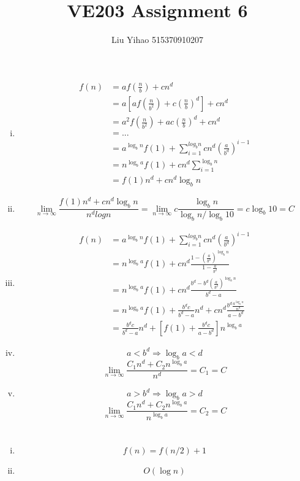 \documentclass{article}
\title{VE203 Assignment 6}
\author{Liu Yihao 515370910207}
\date{}
\begin{document}
\maketitle

\section{}
\begin{enumerate}[i)]
\item
\begin{align*}
f(n)&=af\left(\frac{n}{b}\right)+cn^d\\
&=a\left[af\left(\frac{n}{b^2}\right)+c\left(\frac{n}{b}\right)^d\right]+cn^d\\
&=a^2f\left(\frac{n}{b^2}\right)+ac\left(\frac{n}{b}\right)^d+cn^d\\
&=...\\
&=a^{\log_bn}f(1)+\sum_{i=1}^{log_bn}cn^d\left(\frac{a}{b^d}\right)^{i-1}\\
&=n^{\log_ba}f(1)+cn^d\sum_{i=1}^{\log_bn}\\
&=f(1)n^d+cn^d\log_bn
\end{align*}
\item
$$\lim_{n\to\infty}\frac{f(1)n^d+cn^d\log_bn}{n^dlogn}
=\lim_{n\to\infty}c\frac{\log_bn}{\log_bn/\log_b10}=c\log_b10=C$$
\item
\begin{align*}
f(n)&=a^{\log_bn}f(1)+\sum_{i=1}^{log_bn}cn^d\left(\frac{a}{b^d}\right)^{i-1}\\
&=n^{\log_ba}f(1)+cn^d\frac{1-\left(\frac{a}{b^d}\right)^{\log_bn}}{1-\frac{a}{b^d}}\\
&=n^{\log_ba}f(1)+cn^d\frac{b^d-b^d\left(\frac{a}{b^d}\right)^{\log_bn}}{b^d-a}\\
&=n^{\log_ba}f(1)+\frac{b^dc}{b^d-a}n^d+cn^d\frac{b^d\frac{a^{\log_bn}}{n^d}}{a-b^d}\\
&=\frac{b^dc}{b^d-a}n^d+\left[f(1)+\frac{b^dc}{a-b^d}\right]n^{\log_ba}
\end{align*}
\item
$$a<b^d\Longrightarrow\log_ba<d$$
$$\lim_{n\to\infty}\frac{C_1n^d+C_2n^{\log_ba}}{n^d}=C_1=C$$
\item
$$a>b^d\Longrightarrow\log_ba>d$$
$$\lim_{n\to\infty}\frac{C_1n^d+C_2n^{\log_ba}}{n^{\log_ba}}=C_2=C$$
\end{enumerate}

\section{}
\begin{enumerate}[i)]
\item
$$f(n)=f(n/2)+1$$
\item
$$O(\log n)$$
\end{enumerate}
\end{document}
